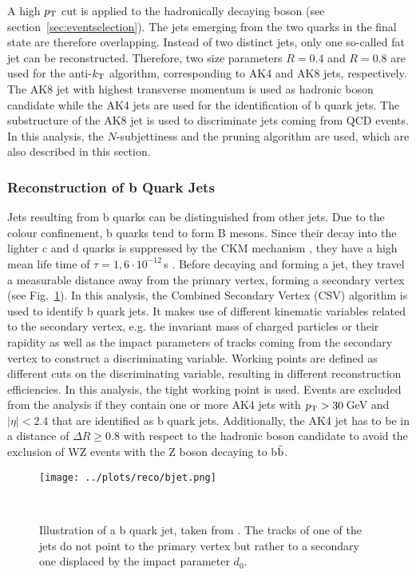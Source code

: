 \noindent A high $p_{\rm T}$ cut is applied to the hadronically decaying boson (see section~\ref{sec:eventselection}). The jets emerging from the two quarks in the final state are therefore overlapping. Instead of two distinct jets, only one so-called fat jet can be reconstructed. Therefore, two size parameters $R=0.4$ and $R=0.8$ are used for the anti-$k_{\rm T}$ algorithm, corresponding to AK4 and AK8 jets, respectively. The AK8 jet with highest transverse momentum is used as hadronic boson candidate while the AK4 jets are used for the identification of b quark jets. The substructure of the AK8 jet is used to discriminate jets coming from QCD events. In this analysis, the $N$-subjettiness and the pruning algorithm are used, which are also described in this section.

\subsubsection*{Reconstruction of b Quark Jets}
Jets resulting from b quarks can be distinguished from other jets. Due to the colour confinement, b quarks tend to form B mesons. Since their decay into the lighter c and d quarks is suppressed by the CKM mechanism \cite{CKM}, they have a high mean life time of $\tau=1,6\cdot 10^{-12}$\,s \cite{SMmasses}. Before decaying and forming a jet, they travel a measurable distance away from the primary vertex, forming a secondary vertex (see Fig.~\ref{fig:reco:bjet}). In this analysis, the Combined Secondary Vertex (CSV) algorithm \cite{CSV1,CSV2} is used to identify b quark jets. It makes use of different kinematic variables related to the secondary vertex, e.g. the invariant mass of charged particles or their rapidity as well as the impact parameters of tracks coming from the secondary vertex to construct a discriminating variable. Working points are defined as different cuts on the discriminating variable, resulting in different reconstruction efficiencies. In this analysis, the tight working point is used. Events are excluded from the analysis if they contain one or more AK4 jets with $p_{\rm T}>30$\,GeV and $|\eta|<2.4$ that are identified as b quark jets. Additionally, the AK4 jet has to be in a distance of $\Delta R \geq 0.8$ with respect to the hadronic boson candidate to avoid the exclusion of WZ events with the Z boson decaying to b$\bar{\rm b}$.
\begin{figure}
    \centering
    \texttt{[image: ../plots/reco/bjet.png]}
    \caption[Illustration of a b quark jet]{Illustration of a b quark jet, taken from \cite{bjet}. The tracks of one of the jets do not point to the primary vertex but rather to a secondary one displaced by the impact parameter $d_0$.}\
    \label{fig:reco:bjet}
\end{figure}

